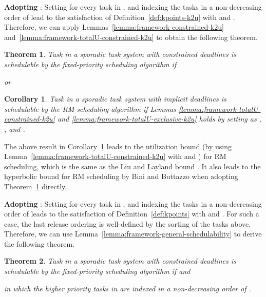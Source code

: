 \documentclass[10pt,conference]{IEEEtran}
\newcommand{\frameworkkq}[1]{}
\newcommand{\frameworkku}[1]{}
\newtheorem{theorem}{Theorem}
\newtheorem{corollary}{Corollary}
\begin{document}
\noindent\textbf{Adopting \frameworkku{}}: \hspace{1cm}
Setting  for every
task  in , and indexing the
tasks in a non-decreasing order of  lead to the satisfaction of
Definition~\ref{def:kpoints-k2u} with  and .
Therefore, we can apply Lemmas~\ref{lemma:framework-constrained-k2u}
and~\ref{lemma:framework-totalU-constrained-k2u} to obtain the
following theorem. 
 
\begin{theorem}
\label{theorem:sporadic-general-k2u}
Task  in a sporadic task system with constrained deadlines is
schedulable by the fixed-priority scheduling algorithm if

or

\end{theorem}

\begin{corollary}
\label{corollary-rm-k2u}
Task  in a sporadic task system with implicit deadlines is
schedulable by the RM scheduling algorithm if
Lemmas \ref{lemma:framework-totalU-constrained-k2u}
and \ref{lemma:framework-totalU-exclusive-k2u}
holds by setting
 as , , and .
\end{corollary}

The above result in Corollary~\ref{corollary-rm-k2u} leads to the
utilization bound  (by using
Lemma~\ref{lemma:framework-totalU-constrained-k2u} with  and
) for RM scheduling, which is the same as the Liu and Layland
bound  \cite{liu1973scheduling}. It also leads to the
hyperbolic bound for RM scheduling by Bini and Buttazzo
\cite{bini2003rate} when adopting
Theorem~\ref{theorem:sporadic-general-k2u} directly.

\noindent\textbf{Adopting \frameworkkq{}}: \hspace{1cm} 
Setting  for every
task  in , and indexing the
tasks in a non-decreasing order of  leads to the satisfaction of
Definition~\ref{def:kpoints} with  and
.  For such a case, the last release ordering is well-defined by the sorting of the tasks above.
Therefore, we can use
Lemma~\ref{lemma:framework-general-schedulability} to derive the
following theorem.

\begin{theorem}
\label{theorem:sporadic-general}
Task  in a sporadic task system with constrained deadlines is
schedulable by the fixed-priority scheduling algorithm if
 and

in which the  higher priority tasks in  are indexed
in a non-decreasing order of .
\end{theorem}
\end{document}

